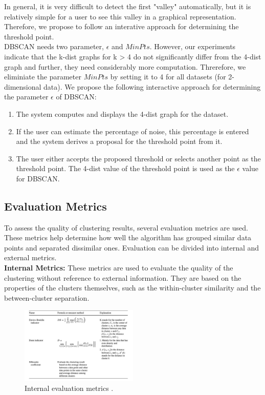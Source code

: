 \documentclass[conference]{IEEEtran}
\begin{document}
In general, it is very difficult to detect the first "valley" automatically, but it is relatively simple for a user to see this valley in a graphical representation. Therefore, we propose to follow an interative approach for determining the threshold point. \\

DBSCAN needs two parameter, \( \epsilon \) and \( MinPts \). However, our experiments indicate that the k-dist graphs for k > 4 do not significantly differ from the 4-dist graph and further, they need considerably more computation. Threrefore, we eliminiate the parameter \( MinPts \) by setting it to 4 for all datasets (for 2-dimensional data). We propose the following interactive approach for determining the parameter \( \epsilon \) of DBSCAN: 

\begin{enumerate}
    \item The system computes and displays the 4-dist graph for the dataset.
    \item If the user can estimate the percentage of noise, this percentage is entered and the system derives a proposal for the threshold point from it.
    \item The user either accepts the proposed threshold or selects another point as the threshold point. The 4-dist value of the threshold point is used as the \( \epsilon \) value for DBSCAN. 
\end{enumerate}


\subsection{Evaluation Metrics}
To assess the quality of clustering results, several evaluation metrics are used. These metrics help determine how well the algorithm has grouped similar data points and separated dissimilar ones. Evaluation can be divided into internal and external metrics. \\

\textbf{Internal Metrics:} These metrics are used to evaluate the quality of the clustering without reference to external information. They are based on the properties of the clusters themselves, such as the within-cluster similarity and the between-cluster separation. \\

\begin{figure}[h]
    \centering
    \includegraphics[width=0.5\textwidth]{internal_eval.png}
    \caption{Internal evaluation metrics \cite{saxena2017clustering}.}
    \label{fig:internal_eval}
\end{figure}
\end{document}
